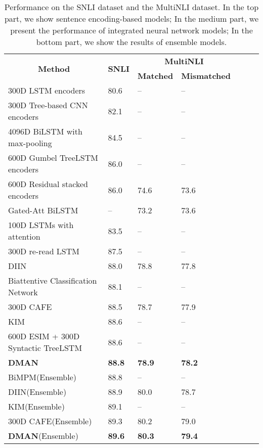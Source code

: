 \documentclass[11pt,letterpaper]{article}
\begin{document}
\begin{table*}[t]
	\begin{center}
		\begin{tabular}{lp{1cm}lp{2cm}cp{2cm}c}
			\toprule
			\multicolumn{1}{c}{\multirow{2}{*}{\textbf{Method}}} & \multicolumn{1}{c}{\multirow{2}{*}{\textbf{SNLI}}} &  \multicolumn{2}{c}{\textbf{MultiNLI}} \\ \cline{3-4} 
			\multicolumn{1}{c}{}  & \multicolumn{1}{c}{}  &		
			\textbf{Matched} &  \textbf{Mismatched} \\
			\midrule
			300D LSTM encoders\cite{bowman2016fast}  & 80.6 & -- & --\\ 
			300D Tree-based CNN encoders\cite{mou2016natural} & 82.1 & -- & --\\
			4096D BiLSTM with max-pooling\cite{conneau2017supervised} & 84.5 & -- & --\\
			600D Gumbel TreeLSTM encoders\cite{choi2017learning}  & 86.0  & -- & --\\ 
			600D Residual stacked encoders\cite{nie2017shortcut}& 86.0  & 74.6 & 73.6 \\ \hline
			Gated-Att BiLSTM\cite{chen2017recurrent} & -- & 73.2 & 73.6\\
			100D LSTMs with attention\cite{rocktaschel2015reasoning} & 83.5 & -- & --\\
			300D re-read LSTM\cite{sha2016reading} & 87.5& -- & --\\
			DIIN\cite{gong2018natural}  & 88.0 & 78.8 & 77.8\\
			Biattentive Classification Network\cite{mccann2017learned} &88.1 & -- & --\\
			300D CAFE\cite{tay2017compare} & 88.5 & 78.7 & 77.9\\
			KIM\cite{chen2017natural} & 88.6& -- & -- \\
			600D ESIM + 300D Syntactic TreeLSTM\cite{chen2017enhanced}  & 88.6 & -- & --\\ 
			\textbf{DMAN} & \textbf{88.8}  & \textbf{78.9} & \textbf{78.2}\\ \hline
			BiMPM(Ensemble)\cite{wang2017bilateral}  & 88.8 & -- & --\\ 
			DIIN(Ensemble)\cite{gong2018natural}  & 88.9 & 80.0 & 78.7 \\ 
			KIM(Ensemble)\cite{chen2017natural}  & 89.1 & -- & --\\ 
			300D CAFE(Ensemble)\cite{tay2017compare}  & 89.3 & 80.2 & 79.0 \\ 
			\textbf{DMAN}(Ensemble) & \textbf{89.6} & \textbf{80.3} & \textbf{79.4} \\
			\bottomrule
		\end{tabular}
		\vspace{2mm}
	\end{center}
	\caption{\label{tab4} Performance on the SNLI dataset and the MultiNLI dataset. In the top part, we show sentence encoding-based models; In the medium part, we present the performance of integrated neural network models; In the bottom part, we show the results of ensemble models.}       
\end{table*}
\end{document}
